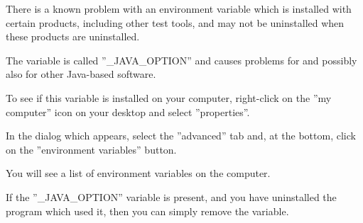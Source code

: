 There is a known problem with an environment variable which is installed with certain products, including other test tools, and may not be uninstalled when these products are uninstalled. 

The variable is called ''\_JAVA\_OPTION'' and causes problems for \app{} and possibly also for other Java-based software.

To see if this variable is installed on your computer, right-click on the ''my computer'' icon on your desktop and select ''properties''. 

In the dialog which appears, select the ''advanced'' tab and, at the bottom, click on the ''environment variables'' button. 

You will see a list of environment variables on the computer. 

If the ''\_JAVA\_OPTION'' variable is present, and you have uninstalled the program which used it, then you can simply remove the variable.
